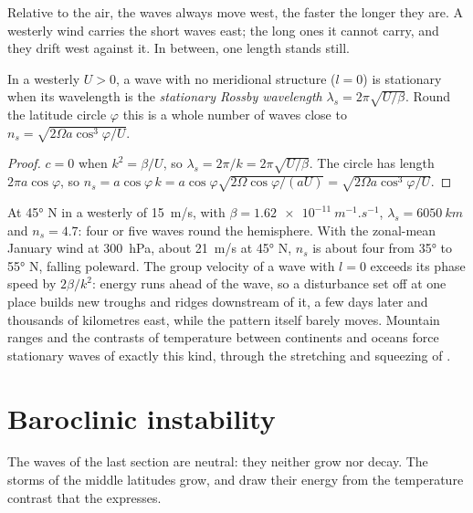 Relative to the air, the waves always move west, the faster the longer
they are. A westerly wind carries the short waves east; the long ones it
cannot carry, and they drift west against it. In between, one length
stands still.

\begin{proposition}\label{prop:b3:atmospheric-dynamics:stationary}
In a westerly $U > 0$, a wave with no meridional structure ($l = 0$) is
stationary when its wavelength is the \emph{stationary Rossby
wavelength} $\lambda_s =
2\pi\sqrt{U/\beta}$. Round the latitude circle $\varphi$ this is a whole
number of waves close to $n_s = \sqrt{2\Omega a\cos^3\varphi/U}$.
\end{proposition}

\begin{proof}
$c = 0$ when $k^2 = \beta/U$, so $\lambda_s = 2\pi/k = 2\pi\sqrt{U/\beta}$.
The circle has length $2\pi a\cos\varphi$, so $n_s = a\cos\varphi\,k =
a\cos\varphi\sqrt{2\Omega\cos\varphi/(aU)} = \sqrt{2\Omega a\cos^3\varphi/U}$.
\end{proof}

At \ang{45} N in a westerly of \qty{15}{m/s}, with $\beta =
\qty{1.62e-11}{m^{-1}.s^{-1}}$, $\lambda_s = \qty{6050}{km}$ and $n_s =
4.7$: four or five waves round the hemisphere. With the zonal-mean
January wind at \qty{300}{hPa}, about \qty{21}{m/s} at \ang{45} N, $n_s$ is
about four from \ang{35} to \ang{55} N, falling poleward. The group velocity
of a wave with $l = 0$ exceeds its phase speed by $2\beta/k^2$: energy runs
ahead of the wave, so a disturbance set off at one place builds new troughs
and ridges downstream of it, a few days later and thousands of kilometres
east, while the pattern itself barely moves. Mountain ranges and the
contrasts of temperature between continents and oceans force stationary
waves of exactly this kind, through the stretching and squeezing of
.


\section{Baroclinic instability}\label{sec:b3:atmospheric-dynamics:baroclinic}

The waves of the last section are neutral: they neither grow nor decay.
The storms of the middle latitudes grow, and draw their energy from the
temperature contrast that the  expresses.

